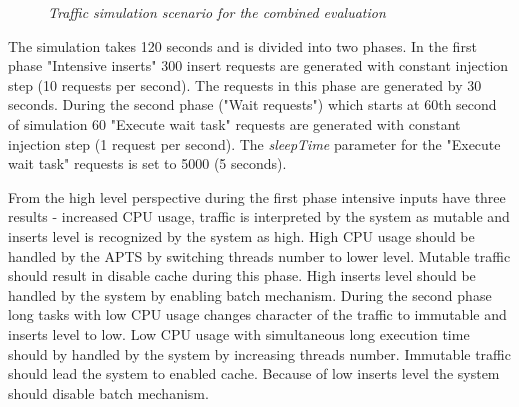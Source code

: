 \documentclass[10pt,a4paper]{article}
\begin{document}
\begin{figure}[!htb]
\begin{center}
\caption{\textit{Traffic simulation scenario for the combined evaluation}} \label{figure:trafficcombined}
\end{center}
\end{figure}

The simulation takes 120 seconds and is divided into two phases. In the first phase "Intensive inserts" 300 insert requests are generated with constant injection step (10 requests per second). The requests in this phase are generated by 30 seconds. During the second phase ("Wait requests") which starts at 60th second of simulation 60 "Execute wait task" requests are generated with constant injection step (1 request per second). The \textit{sleepTime} parameter for the "Execute wait task" requests is set to 5000 (5 seconds).

From the high level perspective during the first phase intensive inputs have three results - increased CPU usage, traffic is interpreted by the system as mutable and inserts level is recognized by the system as high.  High CPU usage should be handled by the APTS by switching threads number to lower level. Mutable traffic should result in disable cache during this phase. High inserts level should be handled by the system by enabling batch mechanism. During the second phase long tasks with low CPU usage changes character of the traffic to immutable and inserts level to low. Low CPU usage with simultaneous long execution time should by handled by the system by increasing threads number. Immutable traffic should lead the system to enabled cache. Because of low inserts level the system should disable batch mechanism. 
\end{document}
